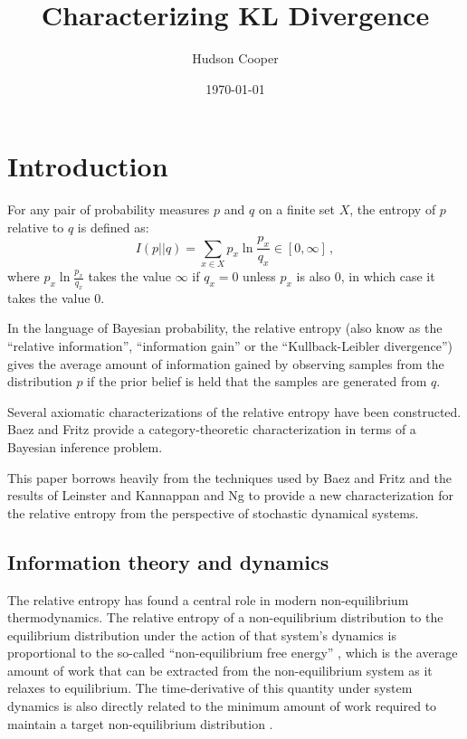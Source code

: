\documentclass{article}
\title{Characterizing KL Divergence}
\author{Hudson Cooper}
\date{\today}
\begin{document}
\maketitle

\section{Introduction}

For any pair of probability measures $p$ and $q$ on a finite set $X$, the entropy of $p$ relative to $q$ is defined as:
\begin{equation*}
    I(p || q) = \sum_{x\in X} p_x \ln \frac{p_x}{q_x} \in [0, \infty]\,,
\end{equation*}
where $p_x \ln \frac{p_x}{q_x}$ takes the value $\infty$ if $q_x = 0$ unless $p_x$ is also $0$, in which case it takes the value $0$.

In the language of Bayesian probability, the relative entropy (also know as the ``relative information'', ``information gain'' or the ``Kullback-Leibler divergence'') gives the average amount of information gained by observing samples from the distribution $p$ if the prior belief is held that the samples are generated from $q$.

Several axiomatic characterizations of the relative entropy have been constructed. Baez and Fritz \cite{baezBayesianCharacterizationRelative2014} provide a category-theoretic characterization in terms of a Bayesian inference problem. 

This paper borrows heavily from the techniques used by Baez and Fritz \cite{baezBayesianCharacterizationRelative2014} and the results of Leinster \cite{leinsterShortCharacterizationRelative2017} and Kannappan and Ng \cite{kannappanMeasurableSolutionsFunctional1973} to provide a new characterization for the relative entropy from the perspective of stochastic dynamical systems.

\subsection{Information theory and dynamics}

The relative entropy has found a central role in modern non-equilibrium thermodynamics. The relative entropy of a non-equilibrium distribution to the equilibrium distribution under the action of that system's dynamics is proportional to the so-called ``non-equilibrium free energy'' \cite{gaveauGeneralFrameworkNonequilibrium1997, shawDrippingFaucetModel1984}, which is the average amount of work that can be extracted from the non-equilibrium system as it relaxes to equilibrium. The time-derivative of this quantity under system dynamics is also directly related to the minimum amount of work required to maintain a target non-equilibrium distribution \cite{horowitzMinimumEnergeticCost2017}.
\end{document}
